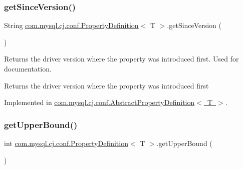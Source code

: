 \mbox{\label{interfacecom_1_1mysql_1_1cj_1_1conf_1_1_property_definition_ab2e3a44b28b1f7d76ae0f3a38029270d}} 
\subsubsection{\texorpdfstring{get\+Since\+Version()}{getSinceVersion()}}
{\footnotesize\ttfamily String \mbox{\hyperlink{interfacecom_1_1mysql_1_1cj_1_1conf_1_1_property_definition}{com.\+mysql.\+cj.\+conf.\+Property\+Definition}}$<$ T $>$.get\+Since\+Version (\begin{DoxyParamCaption}{ }\end{DoxyParamCaption})}

Returns the driver version where the property was introduced first. Used for documentation.

\begin{DoxyReturn}{Returns}
the driver version where the property was introduced first 
\end{DoxyReturn}


Implemented in \mbox{\hyperlink{classcom_1_1mysql_1_1cj_1_1conf_1_1_abstract_property_definition_a7f8ad00dc040a63ca6ec46ebda863a1d}{com.\+mysql.\+cj.\+conf.\+Abstract\+Property\+Definition$<$ T $>$}}.

\mbox{\label{interfacecom_1_1mysql_1_1cj_1_1conf_1_1_property_definition_a6cebd6abc58605df93dbf06fc6c6d487}} 
\subsubsection{\texorpdfstring{get\+Upper\+Bound()}{getUpperBound()}}
{\footnotesize\ttfamily int \mbox{\hyperlink{interfacecom_1_1mysql_1_1cj_1_1conf_1_1_property_definition}{com.\+mysql.\+cj.\+conf.\+Property\+Definition}}$<$ T $>$.get\+Upper\+Bound (\begin{DoxyParamCaption}{ }\end{DoxyParamCaption})}

